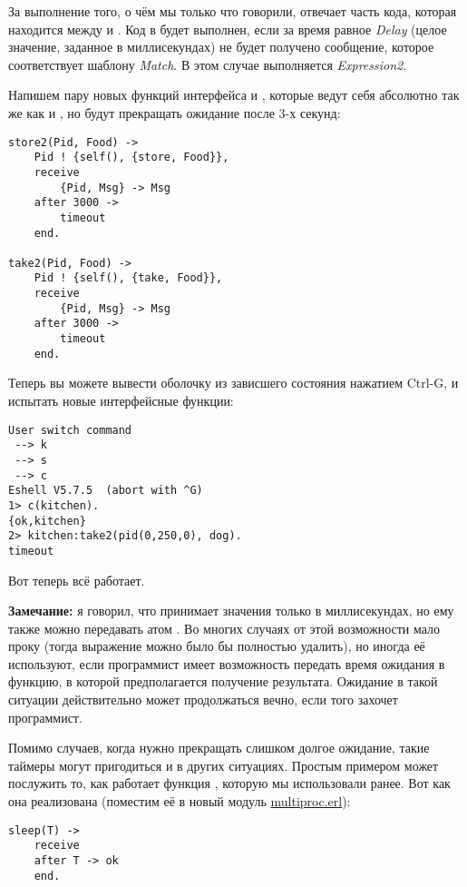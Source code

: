 За выполнение того, о чём мы только что говорили, отвечает часть кода, которая находится между  и .
Код в  будет выполнен, если за время равное \emph{Delay} (целое значение, заданное в миллисекундах) не будет получено сообщение, которое соответствует шаблону \emph{Match}.
В этом случае выполняется \emph{Expression2}.

Напишем пару новых функций интерфейса  и , которые ведут себя абсолютно так же как  и , но будут прекращать ожидание после 3\--х секунд:
\begin{lstlisting}[style=erlang]
store2(Pid, Food) ->
    Pid ! {self(), {store, Food}},
    receive
        {Pid, Msg} -> Msg
    after 3000 ->
        timeout
    end.
 
take2(Pid, Food) ->
    Pid ! {self(), {take, Food}},
    receive
        {Pid, Msg} -> Msg
    after 3000 ->
        timeout
    end.
\end{lstlisting}

Теперь вы можете вывести оболочку из зависшего состояния нажатием Ctrl-G, и испытать новые интерфейсные функции:
\begin{lstlisting}[style=erlang]
User switch command
 --> k
 --> s
 --> c
Eshell V5.7.5  (abort with ^G)
1> c(kitchen).
{ok,kitchen}
2> kitchen:take2(pid(0,250,0), dog).
timeout
\end{lstlisting}

Вот теперь всё работает.\\
\colorbox{lgray}
{
\begin{minipage}{1.0\linewidth}
    \textbf{Замечание:} я говорил, что  принимает значения только в миллисекундах, но ему также можно передавать атом .
    Во многих случаях от этой возможности мало проку (тогда выражение  можно было бы полностью удалить), но иногда её используют, если программист имеет возможность передать время ожидания в функцию, в которой предполагается получение результата.
    Ожидание в такой ситуации действительно может продолжаться вечно, если того захочет программист.
\end{minipage}
}

Помимо случаев, когда нужно прекращать слишком долгое ожидание, такие таймеры могут пригодиться и в других ситуациях.
Простым примером может послужить то, как работает функция , которую мы использовали ранее.
Вот как она реализована (поместим её в новый модуль \href{http://learnyousomeerlang.com/static/erlang/multiproc.erl}{multiproc.erl}):
\begin{lstlisting}[style=erlang]
sleep(T) ->
    receive
    after T -> ok
    end.
\end{lstlisting}


